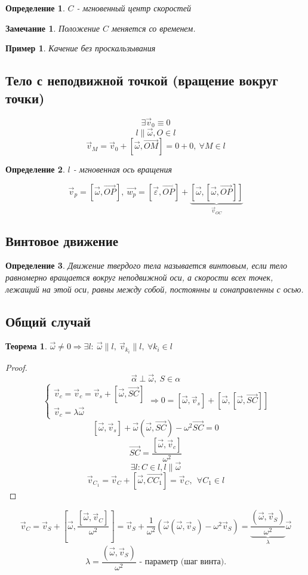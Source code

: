 \documentclass{article}
\renewcommand{\v}[1]{{\vec{#1}}}
\newtheorem*{df}{Определение}
\newtheorem{teo}{Теорема}
\newtheorem*{ntc}{Замечание}
\newtheorem*{xmp}{Пример}
\begin{document}
  \begin{df}
  $C$ - мгновенный центр скоростей
  \end{df}
  \begin{ntc}
  Положение $C$ меняется со временем.
  \end{ntc}
  \begin{xmp}
  Качение без проскальзывания
  \end{xmp}

  \subsection{Тело с неподвижной точкой (вращение вокруг точки)}
  $$ \exists \v{v}_0 \equiv 0 $$
  $$ l \parallel \v{\omega}, O \in l $$
  $$ \v{v}_M = \v{v}_0 + [\v{\omega}, \v{OM}] = 0 + 0,~ \forall M \in l $$
  \begin{df} 
  $l$ - мгновенная ось вращения 
  \end{df}
  $$ \v{v}_p = [\v{\omega}, \v{OP}],~ \v{w_p} = [\v{\varepsilon}, \v{OP}] + \underbrace{[\v{\omega}, [ \v{\omega}, \overrightarrow{OP}]]}_{\v{v}_{OC}} $$
  \subsection{Винтовое движение}
  \begin{df} 
  Движение твердого тела называется винтовым, если тело равномерно вращается вокруг неподвижной оси, а скорости всех точек, лежащий на этой оси, равны между собой, постоянны и сонаправленны с осью.
  \end{df}
  \subsection{Общий случай}
  \begin{teo}
  $ \v{\omega} \neq 0 \Rightarrow \exists l:~ \v{\omega} \parallel l,~ \v{v}_{k_i} \parallel l,~ \forall k_i \in l$
  \end{teo}
  \begin{proof}
  $$ \v{\alpha} \perp \v{\omega},~ S \in \alpha $$
  $$
  \begin{cases}
  \v{v}_c = \v{v}_c = \v{v}_s + [\v{\omega}, \v{SC}] \\
  \v{v}_c = \lambda \v{\omega}
  \end{cases}
  \Rightarrow
  0 = [\v{\omega}, \v{v}_s] + [\v{\omega}, [\v{\omega}, \v{SC}]]
  $$
  $$ [ \v{\omega}, \v{v}_s] + \v{\omega}(\v{\omega}, \v{SC}) - \omega^2 \v{SC} = 0 $$
  $$ \v{SC} = \frac{[\v{\omega},\v{v}_c]}{\omega^2} $$
  $$ \exists l: C \in l, l \parallel \v{\omega} $$
  $$ \v{v}_{C_1} = \v{v}_C + [\v{\omega}, \v{CC_1}] = \v{v}_C,~~ \forall C_1 \in l$$ 

  \end{proof}
  $$\v{v}_C = \v{v}_S + \left[ \v{\omega}, \frac{[\v{\omega}, \v{v}_C]}{\omega^2} \right] = \vec{v}_S + \frac{1}{\omega^2}\left(\vec{\omega}(\vec{\omega}, \vec{v}_S) - \omega^2\vec{v}_S \right) = \underbrace{\frac{(\vec{\omega}, \vec{v}_S)}{\omega^2}}_{\lambda} \vec{\omega}$$
  $$\lambda = \frac{(\vec{\omega}, \vec{v}_S)}{\omega^2} \text{ - параметр (шаг винта).}$$
\end{document}
